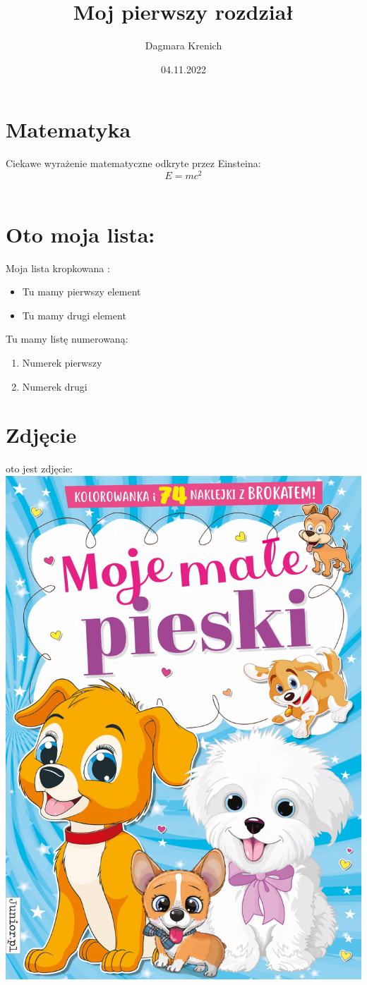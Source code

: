 \documentclass{article}
\title{Moj pierwszy rozdział}
\author{Dagmara Krenich}
\date{04.11.2022}
\begin{document}
\maketitle
\section{Matematyka}
Ciekawe wyrażenie matematyczne odkryte przez Einsteina:
\[ E = mc^ 2 \]\

\section{Oto moja lista: }

Moja lista kropkowana :
\begin{itemize}
    \item Tu mamy pierwszy element
    \item Tu mamy drugi element

\end{itemize}

Tu mamy listę numerowaną:
\begin{enumerate}
    \item Numerek pierwszy
    \item Numerek drugi

\end{enumerate}

\section{Zdjęcie}
oto jest zdjęcie: 
\includegraphics[width=\linewidth]{Pictures/Moje-male-pieski-Cover-410x290-zeszytowa-NB-f.jpg}
\breakpage
\end{document}
